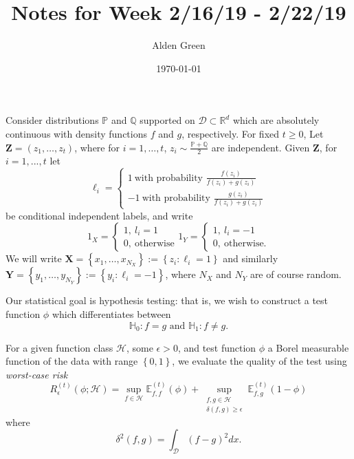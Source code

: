 \documentclass{article}
\newcommand{\Reals}{\mathbb{R}}
\newcommand{\set}[1]{\left\{#1\right\}}
\newcommand{\1}{\mathbb{I}}
\newcommand{\D}{\mathcal{D}}
\newcommand{\Xbf}{\mathbf{X}}
\newcommand{\Ybf}{\mathbf{Y}}
\newcommand{\Zbf}{\mathbf{Z}}
\newcommand{\Hclass}{\mathcal{H}}
\newcommand{\Pbb}{\mathbb{P}}
\newcommand{\Ebb}{\mathbb{E}}
\newcommand{\Qbb}{\mathbb{Q}}
\theoremstyle{alden}
\theoremstyle{aldenthm}
\theoremstyle{definition}
\theoremstyle{remark}
\begin{document}
\title{Notes for Week 2/16/19 - 2/22/19}
\author{Alden Green}
\date{\today}
\maketitle

Consider distributions $\Pbb$ and $\Qbb$ supported on $\D \subset \Reals^d$ which are absolutely continuous with density functions $f$ and $g$, respectively. For fixed $t \geq 0$, Let $\Zbf = (z_1, \ldots,z_t)$, where for $i = 1,\ldots,t$, $z_i \sim \frac{\Pbb + \Qbb}{2}$ are independent. Given $\Zbf$, for $i = 1,...,t$ let
\begin{equation*}
\ell_i = 
\begin{cases}
1~ \text{with probability $\frac{f(z_i)}{f(z_i) + g(z_i)}$} \\
-1~ \text{with probability $\frac{g(z_i)}{f(z_i) + g(z_i)}$}
\end{cases}
\end{equation*} 
be conditional independent labels, and write
\begin{equation*}
1_X = 
\begin{cases}
1,~ l_i = 1\\
0,~ \text{otherwise}
\end{cases}
1_Y = 
\begin{cases}
1,~ l_i = -1 \\
0,~ \text{otherwise.}
\end{cases}
\end{equation*}
We will write $\Xbf = \set{x_1, \ldots,x_{N_X}} := \set{z_i: \ell_i = 1}$ and similarly $\Ybf = \set{y_1, \ldots,y_{N_Y}} := \set{y_i: \ell_i = -1}$, where $N_X$ and $N_Y$ are of course random.

Our statistical goal is hypothesis testing: that is, we wish to construct a test function $\phi$ which differentiates between
\begin{equation*}
\mathbb{H}_0: f = g \text{ and } \mathbb{H}_1: f \neq g.
\end{equation*}

For a given function class $\Hclass$, some $\epsilon > 0$, and test function $\phi$ a Borel measurable function of the data with range $\set{0,1}$, we evaluate the quality of the test using \emph{worst-case risk}
\begin{equation*}
R_{\epsilon}^{(t)}(\phi; \Hclass) = \sup_{f \in \Hclass} \Ebb_{f,f}^{(t)}(\phi) + \sup_{ \substack{f,g \in \Hclass \\ \delta(f,g) \geq \epsilon } } \Ebb_{f,g}^{(t)}(1 - \phi)
\end{equation*} 
where 
\begin{equation*}
\delta^2(f,g) = \int_{\D} (f - g)^2 dx.
\end{equation*}
\end{document}
